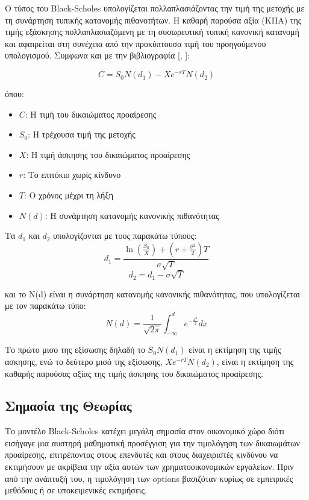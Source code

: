 Ο τύπος του Black-Scholes υπολογίζεται πολλαπλασιάζοντας την τιμή της μετοχής με τη συνάρτηση τυπικής κατανομής πιθανοτήτων. 
Η καθαρή παρούσα αξία (ΚΠΑ) της τιμής εξάσκησης πολλαπλασιαζόμενη με τη συσωρευτική τυπική κανονική κατανομή και αφαιρείται στη συνέχεια από την προκύπτουσα τιμή του προηγούμενου υπολογισμού.
Συμφωνα και με την βιβλιογραφία [\cite{wikipedia_black_scholes}, \cite{haugh_black_scholes_columbia}]:

\begin{equation}
    C = S_0 N(d_1) - X e^{-rT} N(d_2)
\end{equation}

όπου:
\begin{itemize}
    \item $C$: Η τιμή του δικαιώματος προαίρεσης
    \item $S_0$: Η τρέχουσα τιμή της μετοχής
    \item $X$: Η τιμή άσκησης του δικαιώματος προαίρεσης
    \item $r$: Το επιτόκιο χωρίς κίνδυνο
    \item $T$: Ο χρόνος μέχρι τη λήξη
    \item $N(d)$: Η συνάρτηση κατανομής κανονικής πιθανότητας
\end{itemize}

Τα $d_1$ και $d_2$ υπολογίζονται με τους παρακάτω τύπους:
\begin{equation}
    d_1 = \frac{\ln(\frac{S_0}{X}) + (r + \frac{\sigma^2}{2})T}{\sigma \sqrt{T}}
\end{equation}
\begin{equation}
    d_2 = d_1 - \sigma \sqrt{T}
\end{equation}

και το N(d) είναι η συνάρτηση κατανομής κανονικής πιθανότητας, που υπολογίζεται με τον παρακάτω τύπο:
\begin{equation}
    N(d) = \frac{1}{\sqrt{2\pi}} \int_{-\infty}^{d} e^{-\frac{x^2}{2}} dx
\end{equation}

Το πρώτο μισο της εξίσωσης δηλαδή το $S_0 N(d_1)$ είναι η εκτίμηση της τιμής ασκησης,
ενώ το δεύτερο μισό της εξίσωσης, $X e^{-rT} N(d_2)$, είναι η εκτίμηση της καθαρής παρούσας αξίας της τιμής άσκησης του δικαιώματος προαίρεσης.

\subsection{Σημασία της Θεωρίας}
Το μοντέλο Black-Scholes κατέχει μεγάλη σημασία στον οικονομικό χώρο διότι εισήγαγε μια αυστηρή μαθηματική προσέγγιση για την τιμολόγηση των δικαιωμάτων προαίρεσης,
επιτρέποντας στους επενδυτές και στους διαχειριστές κινδύνου να εκτιμήσουν με ακρίβεια την αξία αυτών των χρηματοοικονομικών εργαλείων.
Πριν από την ανάπτυξή του, η τιμολόγηση των options βασιζόταν κυρίως σε εμπειρικές μεθόδους ή σε υποκειμενικές εκτιμήσεις.

